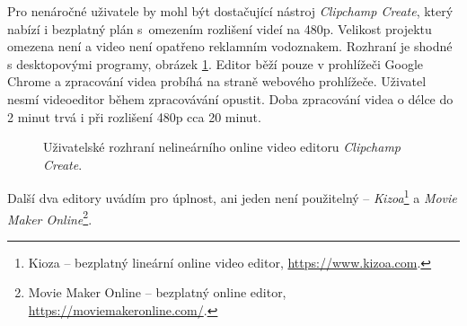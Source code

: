 Pro nenáročné uživatele by mohl být dostačující nástroj \textit{Clipchamp Create}, který nabízí i bezplatný plán s~omezením rozlišení videí na 480p. Velikost projektu omezena není a video není opatřeno reklamním vodoznakem. Rozhraní je shodné s desktopovými programy, obrázek \ref{img:clipchamp}. Editor běží pouze v prohlížeči Google Chrome a zpracování videa probíhá na straně webového prohlížeče. Uživatel nesmí videoeditor během zpracovávání opustit. Doba zpracování videa o délce do 2 minut trvá i při rozlišení 480p cca 20 minut.
\begin{figure}[h]
	\centering
	\caption{Uživatelské rozhraní nelineárního online video editoru \textit{Clipchamp Create}.}\label{img:clipchamp}
\end{figure}

Další dva editory uvádím pro úplnost, ani jeden není použitelný -- \textit{Kizoa}\footnote{Kioza -- bezplatný lineární online video editor, \url{https://www.kizoa.com}.} a \textit{Movie Maker Online}\footnote{Movie Maker Online -- bezplatný online editor, \url{https://moviemakeronline.com/}.}.

